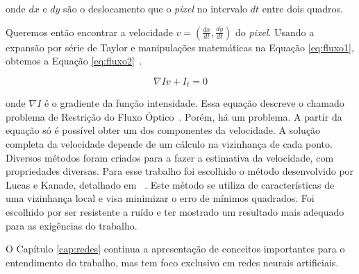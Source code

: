 onde $dx$ e $dy$ são o deslocamento que o \textit{pixel} no intervalo $dt$ entre dois quadros.

Queremos então encontrar a velocidade $v =(\frac{dx}{dt},\frac{dy}{dt})$ do \textit{pixel}. Usando a expansão por série de Taylor e manipulações matemáticas na Equação \ref{eq:fluxo1}, obtemos a Equação \ref{eq:fluxo2}~\cite{faria1992fluxo}.

\begin{equation}
	\nabla Iv + I_t = 0
\label{eq:fluxo2}
\end{equation}

onde $\nabla I$ é o gradiente da função intensidade. Essa equação descreve o chamado problema de Restrição do Fluxo Óptico~\cite{mota2011tensor}. Porém, há um problema. A partir da equação só é possível obter um dos componentes da velocidade. A solução completa da velocidade depende de um cálculo na vizinhança de cada ponto. Diversos métodos foram criados para a fazer a estimativa da velocidade, com propriedades diversas. Para esse trabalho foi escolhido o método desenvolvido por Lucas e Kanade, detalhado em ~\cite{bruhn2005lucas,faria1992fluxo,mota2011tensor}. Este método se utiliza de características de uma vizinhança local e visa minimizar o erro de mínimos quadrados. Foi escolhido por ser resistente a ruído e ter mostrado um resultado mais adequado para as exigências do trabalho.



O Capítulo \ref{cap:redes} continua a apresentação de conceitos importantes para o entendimento do trabalho, mas tem foco exclusivo em redes neurais artificiais. 






